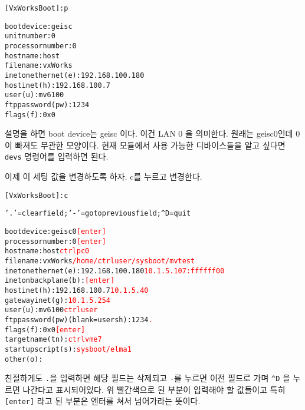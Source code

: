 \documentclass[11pt,a4paper]{article}
\begin{document}
\begin{framed}
\begin{alltt}
[VxWorks Boot]: p

boot device          : geisc
unit number          : 0 
processor number     : 0 
host name            : host
file name            : vxWorks
inet on ethernet (e) : 192.168.100.180
host inet (h)        : 192.168.100.7
user (u)             : mv6100
ftp password (pw)    : 1234
flags (f)            : 0x0 
\end{alltt}
\end{framed}

설명을 하면 boot device는 geisc 이다. 이건 LAN 0 을 의미한다. 
원래는 geisc0인데 0이 빠져도 무관한 모양이다. 현재 모듈에서 사용 가능한 디바이스들을 알고 싶다면
\verb|devs| 명령어를 입력하면 된다.

이제 이 세팅 값을 변경하도록 하자. c를 누르고 변경한다. 
\begin{framed}
\begin{alltt}
[VxWorks Boot]: c

'.' = clear field;  '-' = go to previous field;  ^D = quit

boot device          : geisc0    		\textcolor{red}{[enter]}
processor number     : 0         		\textcolor{red}{[enter]}
host name            : host      		\textcolor{red}{ctrlpc0}
file name            : vxWorks			\textcolor{red}{/home/ctrluser/sysboot/mvtest}
inet on ethernet (e) : 192.168.100.180	\textcolor{red}{10.1.5.107:ffffff00}
inet on backplane (b): 				\textcolor{red}{[enter]}
host inet (h)        : 192.168.100.7 	\textcolor{red}{10.1.5.40}
gateway inet (g)     : 				\textcolor{red}{10.1.5.254}
user (u)             : mv6100 			\textcolor{red}{ctrluser}
ftp password (pw) (blank = use rsh): 1234 \textcolor{red}{.}
flags (f)            : 0x0  			\textcolor{red}{[enter]}
target name (tn)     : 				\textcolor{red}{ctrlvme7}
startup script (s)   : 				\textcolor{red}{sysboot/elma1}
other (o)            : 
\end{alltt}
\end{framed}
친절하게도 \verb|.|을 입력하면 해당 필드는 삭제되고 \verb|-|를 누르면 이전 필드로 가며 \verb|^D| 을 누르면 
나간다고 표시되어있다. 위 빨간색으로 된 부분이 입력해야 할 값들이고 특히 \verb|[enter]| 라고 된 부분은 엔터를 
쳐서 넘어가라는 뜻이다.\\
\end{document}
